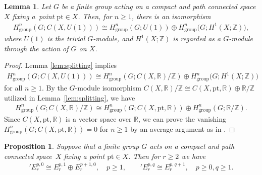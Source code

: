 \documentclass[pdftex]{sigma}
\newtheorem{prop}[thm]{Proposition}
\newtheorem{lem}[thm]{Lemma}
\theoremstyle{definition}
\newcommand{\R}{\mathbb{R}}
\newcommand{\Z}{\mathbb{Z}}
\newcommand{\pt}{\mathrm{pt}}
\begin{document}
\begin{lem} \label{lem:splitting_group_coh}
Let $G$ be a finite group acting on a compact and path connected space $X$ fixing a~point $\pt \in X$. Then, for $n \ge 1$, there is an isomorphism
\begin{gather*}
H^n_{\mathrm{group}}(G; C(X, U(1))) \cong H^n_{\mathrm{group}}(G; U(1)) \oplus H^n_{\mathrm{group}}\big(G; H^1(X; \Z)\big),
\end{gather*}
where $U(1)$ is the trivial $G$-module, and $H^1(X; \Z)$ is regarded as a $G$-module through the action of $G$ on $X$.
\end{lem}

\begin{proof}
Lemma \ref{lem:splitting} implies
\begin{gather*}
H^n_{\mathrm{group}}(G; C(X, U(1))) \cong H^{n}_{\mathrm{group}}(G; C(X, \R)/\Z) \oplus H^n_{\mathrm{group}}\big(G; H^1(X; \Z)\big)
\end{gather*}
for all $n \ge 1$. By the $G$-module isomorphism $C(X, \R)/\Z \cong C(X, \pt, \R) \oplus \R/\Z$ utilized in Lem\-ma~\ref{lem:splitting}, we have
\begin{gather*}
H^n_{\mathrm{group}}(G; C(X, \R)/\Z) \cong H^n_{\mathrm{group}}(G; C(X, \pt, \R)) \oplus H^n_{\mathrm{group}}(G; \R/\Z).
\end{gather*}
Since $C(X, \pt, \R)$ is a vector space over $\R$, we can prove the vanishing $H^n_{\mathrm{group}}(G; C(X, \pt, \R)) = 0$
for $n \ge 1$ by an average argument as in \cite[Lemma 4.4]{G2}.
\end{proof}

\begin{prop} \label{prop:splitting_spectral_seq}
Suppose that a finite group $G$ acts on a compact and path connected space~$X$ fixing a point $\pt \in X$. Then for $r \ge 2$ we have
\begin{gather*}
{}'E^{p, 0}_r \cong E^{p, 1}_r \oplus E^{p+1, 0}_r, \quad p \ge 1, \qquad {}'E^{p, q}_r \cong E^{p, q+1}_r, \quad p \ge 0, q \ge 1.
\end{gather*}
\end{prop}
\end{document}
